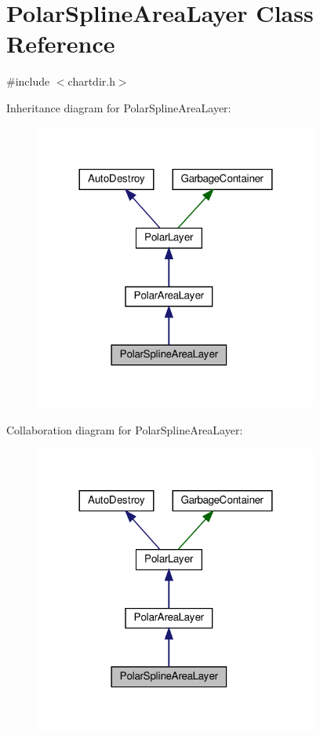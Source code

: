 \hypertarget{class_polar_spline_area_layer}{}\section{Polar\+Spline\+Area\+Layer Class Reference}
\label{class_polar_spline_area_layer}


{\ttfamily \#include $<$chartdir.\+h$>$}



Inheritance diagram for Polar\+Spline\+Area\+Layer\+:
\nopagebreak
\begin{figure}[H]
\begin{center}
\leavevmode
\includegraphics[width=264pt]{class_polar_spline_area_layer__inherit__graph}
\end{center}
\end{figure}


Collaboration diagram for Polar\+Spline\+Area\+Layer\+:
\nopagebreak
\begin{figure}[H]
\begin{center}
\leavevmode
\includegraphics[width=264pt]{class_polar_spline_area_layer__coll__graph}
\end{center}
\end{figure}
